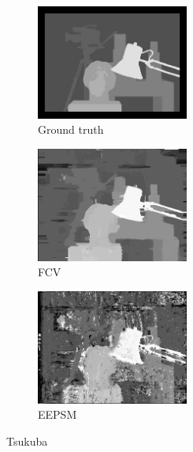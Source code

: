 \begin{figure}[ht]
  \centering
  \begin{subfigure}[t]{0.3\textwidth}
    \centering\includegraphics[width=5cm]{figures/tsu_gt}
    \caption{Ground truth \label{fig:tsu_gt}}
  \end{subfigure}\hspace{0.5cm}
  \begin{subfigure}[t]{0.3\textwidth}
    \centering\includegraphics[width=5cm]{figures/tsu_fcv}
    \caption{FCV\label{fig:tsu_fcv}}
  \end{subfigure}\hspace{0.5cm}
  \begin{subfigure}[t]{0.3\textwidth}
    \centering\includegraphics[width=5cm]{figures/tsu_eepsm}
    \caption{EEPSM\label{fig:tsu_eepsm}}
  \end{subfigure}
  \caption{Tsukuba \cite{Scharstein2002}\label{fig:tsuall}}
\end{figure}

